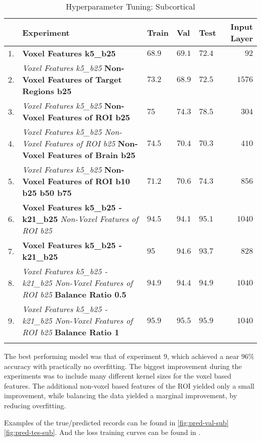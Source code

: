 \begin{longtable}[H]{|r|p{9cm}|l|l|l|r|}
\hline
 & \textbf{Experiment} & \textbf{Train} & \textbf{Val} & \textbf{Test} & \textbf{Input Layer} \\ \hline
1. & \textbf{Voxel Features k5\_b25} & $68.9$ & $69.1$ & $72.4$ & $92$  \\ \hline
2. & \emph{Voxel Features k5\_b25} \newline \textbf{Non-Voxel Features of Target Regions b25} & $73.2$ & $68.9$ & $72.5$ & $1576$ \\ \hline
3. & \emph{Voxel Features k5\_b25} \newline \textbf{Non-Voxel Features of ROI b25} & $75$ & $74.3$ & $78.5$ & $304$ \\ \hline
4. & \emph{Voxel Features k5\_b25 \newline Non-Voxel Features of ROI b25} \newline \textbf{Non-Voxel Features of Brain b25} & $74.5$ & $70.4$ & $70.3$ & $410$ \\ \hline
5. & \emph{Voxel Features k5\_b25} \newline \textbf{Non-Voxel Features of ROI b10 b25 b50 b75} & $71.2$ & $70.6$ & $74.3$ & $856$ \\ \hline
6. & \textbf{Voxel Features k5\_b25 - k21\_b25} \newline \emph{Non-Voxel Features of ROI b25} & $94.5$ & $94.1$ & $95.1$ & $1040$ \\ \hline
7. & \textbf{Voxel Features k5\_b25 - k21\_b25} & $95$ & $94.6$ & $93.7$ & $828$ \\ \hline
8. & \emph{Voxel Features k5\_b25 - k21\_b25 \newline Non-Voxel Features of ROI b25} \newline \textbf{Balance Ratio 0.5} & $94.9$ & $94.4$ & $94.9$ & $1040$ \\ \hline
9. & \emph{Voxel Features k5\_b25 - k21\_b25 \newline Non-Voxel Features of ROI b25} \newline \textbf{Balance Ratio 1} & $95.9$ & $95.5$ & $95.9$ & $1040$ \\ \hline
\caption{Hyperparameter Tuning: Subcortical}
\label{tab:expsub}
\end{longtable}

The best performing model was that of experiment 9, which achieved a near $96\%$ accuracy with practically no overfitting. The biggest improvement during the experiments was to include many different kernel sizes for the voxel based features. The additional non-voxel based features of the \ac{ROI} yielded only a small improvement, while balancing the data yielded a marginal improvement, by reducing overfitting.\par
Examples of the true/predicted records can be found in  \ref{fig:pred-val-sub} \ref{fig:pred-tes-sub}. And the loss training curves can be found in .

